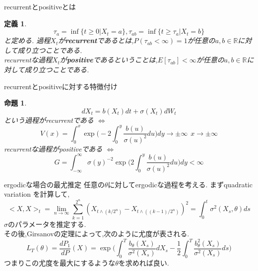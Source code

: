 \documentclass[dvipdfmx,cjk]{beamer}
\numberwithin{equation}{section}
\newtheorem{Def}     [Thm]{定義}
\newtheorem{Prop}    [Thm]{命題}
\def\iff{\Leftrightarrow}
\def\R{\mathbb R}
\def\prop{\begin{Prop}}
\def\propx{\end{Prop}}
\def\defb{\begin{Def}}
\def\defx{\end{Def}}
\begin{document}
\begin{frame}{recurrentとpositiveとは}
\defb
\[
\tau_a = \inf \{ t\ge 0 |X_t =a \} , \tau_{ab} = \inf \{ t \ge \tau_a | X_t =b \}
\]
と定める.
過程$X_t$が{\bf recurrent}であるとは,$P(\tau_{ab} < \infty) =1$が任意の$a,b\in\R$に対して成り立つことである.\\
recurrentな過程$X_t$が{\bf positive}であるということは,$E[\tau_{ab}] < \infty$が任意の$a,b\in\R$に対して成り立つことである.\\
\defx
\end{frame}

\begin{frame}{recurrentとpositiveに対する特徴付け}
\prop
\[
dX_t = b (X_t) dt + \sigma (X_t) dW_t
\]
という過程がrecurrentである $\iff$
\[
V(x) = \int_{0}^x \exp \biggl( -2 \int_{0}^y \frac{b(u)}{\sigma(u)^2} du \biggl) dy   \to \pm\infty \ \ x\to \pm\infty
\]
recurrentな過程がpositiveである $\iff$
\[
G= \int_{-\infty}^\infty \sigma(y)^{-2} \exp \biggl( 2 \int_{0}^y \frac{b(u)}{\sigma(u)^2} du \biggl) dy  < \infty
\]
\propx
\end{frame}


\begin{frame}{ergodicな場合の最尤推定}
任意の$\theta$に対してergodicな過程を考える.\pause 
まずquadratic variation を計算して,
\[
<X,X>_t = \lim_{n\to\infty} \sum_{k=1}^{2^n} (X_{t\wedge (k/2^n)} - X_{t\wedge ((k-1)/2^n)})^2 =
\int_0^t \sigma^2(X_s,\theta)ds 
\]
$\sigma$のパラメータを推定する.\\ \pause
その後,Girsanovの定理によって,次のように尤度が表される.
\[
L_T(\theta) = \frac{dP_1}{dP}(X)  
	= \exp \biggl( \int_0^T \frac{b_\theta(X_s)}{\sigma^2(X_s)} dX_s - 
	\frac{1}{2} \int_0^T \frac{ b_\theta^2(X_s) }{\sigma^2(X_s)} ds
	 \biggl)
\]
つまりこの尤度を最大にするような$\theta$を求めれば良い.\\

\end{frame}
\end{document}
